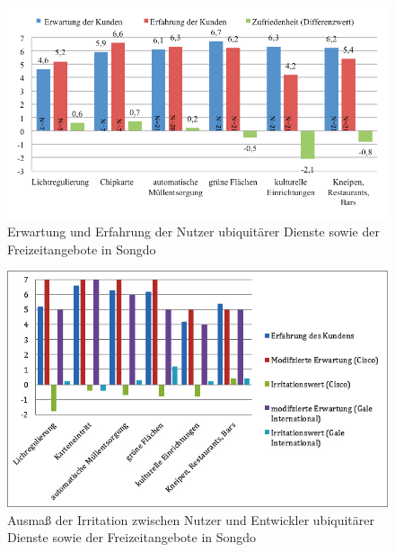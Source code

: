 \documentclass[a4paper,
fontsize=11pt,
oneside,
numbers=noperiodatend,
parskip=half-,
bibliography=totoc,
final
]{scrartcl}
\begin{document}
\begin{figure}[htbp]
\centering
\includegraphics{img/Abbildung8.jpg}
\caption{Erwartung und Erfahrung der Nutzer ubiquitärer Dienste sowie
der Freizeitangebote in Songdo}
\end{figure}

\begin{figure}[htbp]
\centering
\includegraphics{img/Abbildung9.jpg}
\caption{Ausmaß der Irritation zwischen Nutzer und Entwickler
ubiquitärer Dienste sowie der Freizeitangebote in Songdo}
\end{figure}
\end{document}
